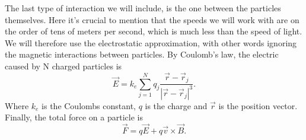 \documentclass[english,notitlepage,reprint,nofootinbib]{revtex4-1}
\begin{document}
The last type of interaction we will include, is the one between the particles themselves. Here it's crucial to mention that the speeds we will work with are on the order of tens of meters per second, which is much less than the speed of light. We will therefore use the electrostatic approximation, with other words ignoring the magnetic interactions between particles. By Coulomb's law, the electric caused by N charged particles is
\begin{equation}
 \vec{E} = k_e \sum_{j=1}^N q_j \frac{\vec{r} - \vec{r}_j}{|\vec{r} - \vec{r}_j|^3} .
 \end{equation}
Where $k_e$ is the Coulombs constant, $q$ is the charge and $\vec{r}$ is the position vector. Finally, the total force on a particle is
\begin{equation}
 \vec{F} = q \vec{E} + q \vec{v} \times \vec{B} .
\end{equation}
\end{document}
